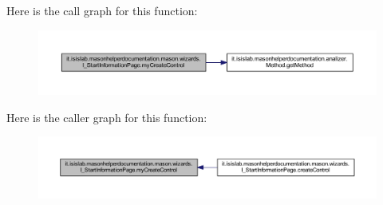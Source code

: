 Here is the call graph for this function\-:\nopagebreak
\begin{figure}[H]
\begin{center}
\leavevmode
\includegraphics[width=350pt]{classit_1_1isislab_1_1masonhelperdocumentation_1_1mason_1_1wizards_1_1_i___start_information_page_a11ff2fb4c6af0ac2cc873e0b56553c55_cgraph}
\end{center}
\end{figure}




Here is the caller graph for this function\-:\nopagebreak
\begin{figure}[H]
\begin{center}
\leavevmode
\includegraphics[width=350pt]{classit_1_1isislab_1_1masonhelperdocumentation_1_1mason_1_1wizards_1_1_i___start_information_page_a11ff2fb4c6af0ac2cc873e0b56553c55_icgraph}
\end{center}
\end{figure}




